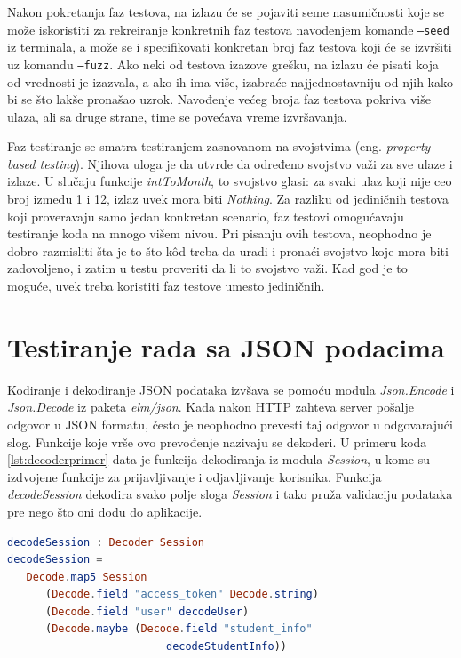 \documentclass[12pt,oneside]{memoir}
\begin{document}
\par Nakon pokretanja faz testova, na izlazu će se pojaviti seme nasumičnosti koje se može iskoristiti za rekreiranje konkretnih faz testova navođenjem komande \texttt{---seed} iz terminala, a može se i specifikovati konkretan broj faz testova koji će se izvršiti uz komandu \texttt{---fuzz}. Ako neki od testova izazove grešku, na izlazu će pisati koja od vrednosti je izazvala, a ako ih ima više, izabraće najjednostavniju od njih kako bi se što lakše pronašao uzrok. Navođenje većeg broja faz testova pokriva više ulaza, ali sa druge strane, time se povećava vreme izvršavanja. 
\par Faz testiranje se smatra testiranjem zasnovanom na svojstvima (eng. \emph{property based testing}). Njihova uloga je da utvrde da određeno svojstvo važi za sve ulaze i izlaze. U slučaju funkcije \emph{intToMonth}, to svojstvo glasi: za svaki ulaz koji nije ceo broj između 1 i 12, izlaz uvek mora biti \emph{Nothing}. Za razliku od jediničnih testova koji proveravaju samo jedan konkretan scenario, faz testovi omogućavaju testiranje koda na mnogo višem nivou. Pri pisanju ovih testova, neophodno je dobro razmisliti šta je to što k\^{o}d treba da uradi i pronaći svojstvo koje mora biti zadovoljeno, i zatim u testu proveriti da li to svojstvo važi. Kad god je to moguće, uvek treba koristiti faz testove umesto jediničnih. 

\section{Testiranje rada sa JSON podacima}
\par Kodiranje i dekodiranje JSON podataka izvšava se pomoću modula \emph{Json.Encode} i \emph{Json.Decode} iz paketa \emph{elm/json}. Kada nakon HTTP zahteva server pošalje odgovor u JSON formatu, često je neophodno prevesti taj odgovor u odgovarajući slog. Funkcije koje vrše ovo prevođenje nazivaju se dekoderi. U primeru koda \ref{lst:decoderprimer} data je funkcija dekodiranja iz modula \emph{Session}, u kome su izdvojene funkcije za prijavljivanje i odjavljivanje korisnika. Funkcija \emph{decodeSession} dekodira svako polje sloga \emph{Session} i tako pruža validaciju podataka pre nego što oni dođu do aplikacije. 

\begin{minipage}{\linewidth}
\begin{lstlisting}[language=elm, basicstyle=\small, caption={Implementacija funkcije dekodiranja \emph{decodeSession}},captionpos=b, label={lst:decoderprimer}]
decodeSession : Decoder Session
decodeSession =
   Decode.map5 Session
      (Decode.field "access_token" Decode.string)
      (Decode.field "user" decodeUser)
      (Decode.maybe (Decode.field "student_info"
      			         decodeStudentInfo))
\end{lstlisting}
\end{minipage}
\end{document}
